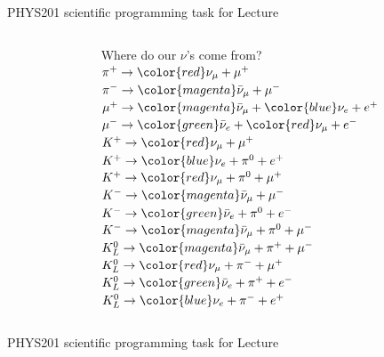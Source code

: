 {\begin{frame}{PHYS201 scientific programming task for Lecture \thislecture}
\begin{columns}
\begin{column}{0.78\textwidth}
    \end{column}
    \begin{column}{0.22\textwidth}
     \begin{block}{}
     {\scriptsize
      Where do our $\nu$'s come from?\\
      \vspace{0.3cm}
      $\pi^{+} \rightarrow {\color{red}\nu_{\mu}} + \mu^{+}$\\
      $\pi^{-} \rightarrow {\color{magenta}\bar{\nu}_{\mu}} + \mu^{-}$\\
      $\mu^{+} \rightarrow {\color{magenta}\bar{\nu}_{\mu}} + {\color{blue}\nu_{e}} + e^{+}$\\
      $\mu^{-} \rightarrow {\color{green}\bar{\nu}_{e}} + {\color{red}\nu_{\mu}} + e^{-}$\\
      $K^{+} \rightarrow {\color{red}\nu_{\mu}} + \mu^{+}$\\
      $K^{+} \rightarrow {\color{blue}\nu_{e}} + \pi^{0} + e^{+}$\\
      $K^{+} \rightarrow {\color{red}\nu_{\mu}} + \pi^{0} + \mu^{+}$\\
      $K^{-} \rightarrow {\color{magenta}\bar{\nu}_{\mu}} + \mu^{-}$\\
      $K^{-} \rightarrow {\color{green}\bar{\nu}_{e}} + \pi^{0} + e^{-}$\\
      $K^{-} \rightarrow {\color{magenta}\bar{\nu}_{\mu}} + \pi^{0} + \mu^{-}$\\
      $K_{L}^{0} \rightarrow {\color{magenta}\bar{\nu}_{\mu}} + \pi^{+} + \mu^{-}$\\
      $K_{L}^{0} \rightarrow {\color{red}\nu_{\mu}} + \pi^{-} + \mu^{+}$\\
      $K_{L}^{0} \rightarrow {\color{green}\bar{\nu}_{e}} + \pi^{+} + e^{-}$\\
      $K_{L}^{0} \rightarrow {\color{blue}\nu_{e}} + \pi^{-} + e^{+}$\\
    }
    \end{block}
    \end{column}
  \end{columns}

\end{frame}


%
%
%

\begin{frame}{PHYS201 scientific programming task for Lecture \thislecture}


\end{frame}}
